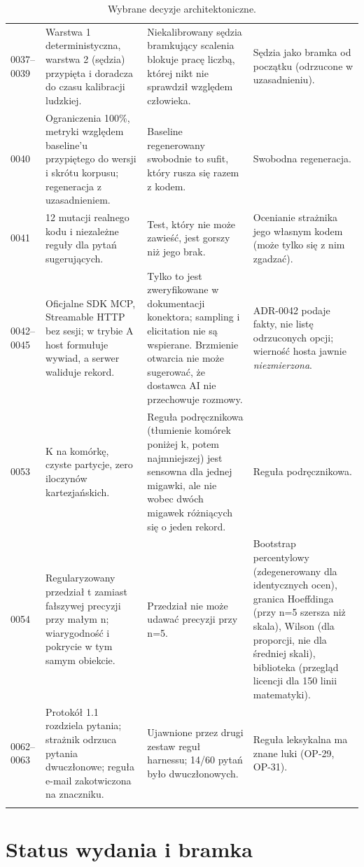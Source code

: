 {\begin{longtable}{@{}p{1.5cm}p{3.6cm}p{4.9cm}p{4.2cm}@{}}
0037--0039 & Warstwa 1 deterministyczna, warstwa 2 (sędzia) przypięta i doradcza do czasu kalibracji ludzkiej. & Niekalibrowany sędzia bramkujący scalenia blokuje pracę liczbą, której nikt nie sprawdził względem człowieka. & Sędzia jako bramka od początku (odrzucone w uzasadnieniu). \\
0040 & Ograniczenia 100\%, metryki względem baseline'u przypiętego do wersji i skrótu korpusu; regeneracja z uzasadnieniem. & Baseline regenerowany swobodnie to sufit, który rusza się razem z kodem. & Swobodna regeneracja. \\
0041 & 12 mutacji realnego kodu i niezależne reguły dla pytań sugerujących. & Test, który nie może zawieść, jest gorszy niż jego brak. & Ocenianie strażnika jego własnym kodem (może tylko się z nim zgadzać). \\
0042--0045 & Oficjalne SDK MCP, Streamable HTTP bez sesji; w trybie A host formułuje wywiad, a serwer waliduje rekord. & Tylko to jest zweryfikowane w dokumentacji konektora; sampling i elicitation nie są wspierane. Brzmienie otwarcia nie może sugerować, że dostawca AI nie przechowuje rozmowy. & ADR-0042 podaje fakty, nie listę odrzuconych opcji; wierność hosta jawnie \emph{niezmierzona}. \\
0053 & K na komórkę, czyste partycje, zero iloczynów kartezjańskich. & Reguła podręcznikowa (tłumienie komórek poniżej k, potem najmniejszej) jest sensowna dla jednej migawki, ale nie wobec dwóch migawek różniących się o jeden rekord. & Reguła podręcznikowa. \\
0054 & Regularyzowany przedział t zamiast fałszywej precyzji przy małym n; wiarygodność i pokrycie w tym samym obiekcie. & Przedział nie może udawać precyzji przy n=5. & Bootstrap percentylowy (zdegenerowany dla identycznych ocen), granica Hoeffdinga (przy n=5 szersza niż skala), Wilson (dla proporcji, nie dla średniej skali), biblioteka (przegląd licencji dla 150 linii matematyki). \\
0062--0063 & Protokół 1.1 rozdziela pytania; strażnik odrzuca pytania dwuczłonowe; reguła e-mail zakotwiczona na znaczniku. & Ujawnione przez drugi zestaw reguł harnessu; 14/60 pytań było dwuczłonowych. & Reguła leksykalna ma znane luki (OP-29, OP-31). \\
\bottomrule
\caption{Wybrane decyzje architektoniczne.}
\end{longtable}
}

\section{Status wydania i bramka}
\label{sec:p4-bramka}

